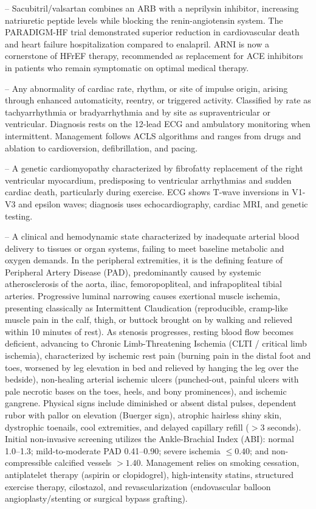-- Sacubitril/valsartan combines an ARB with a neprilysin inhibitor, increasing natriuretic peptide levels while blocking the renin-angiotensin system. The PARADIGM-HF trial demonstrated superior reduction in cardiovascular death and heart failure hospitalization compared to enalapril. ARNI is now a cornerstone of HFrEF therapy, recommended as replacement for ACE inhibitors in patients who remain symptomatic on optimal medical therapy.

-- Any abnormality of cardiac rate, rhythm, or site of impulse origin, arising through enhanced automaticity, reentry, or triggered activity. Classified by rate as tachyarrhythmia or bradyarrhythmia and by site as supraventricular or ventricular. Diagnosis rests on the 12-lead ECG and ambulatory monitoring when intermittent. Management follows ACLS algorithms and ranges from drugs and ablation to cardioversion, defibrillation, and pacing.

-- A genetic cardiomyopathy characterized by fibrofatty replacement of the right ventricular myocardium, predisposing to ventricular arrhythmias and sudden cardiac death, particularly during exercise. ECG shows T-wave inversions in V1-V3 and epsilon waves; diagnosis uses echocardiography, cardiac MRI, and genetic testing.

-- A clinical and hemodynamic state characterized by inadequate arterial blood delivery to tissues or organ systems, failing to meet baseline metabolic and oxygen demands. In the peripheral extremities, it is the defining feature of Peripheral Artery Disease (PAD), predominantly caused by systemic atherosclerosis of the aorta, iliac, femoropopliteal, and infrapopliteal tibial arteries. Progressive luminal narrowing causes exertional muscle ischemia, presenting classically as Intermittent Claudication (reproducible, cramp-like muscle pain in the calf, thigh, or buttock brought on by walking and relieved within 10 minutes of rest). As stenosis progresses, resting blood flow becomes deficient, advancing to Chronic Limb-Threatening Ischemia (CLTI / critical limb ischemia), characterized by ischemic rest pain (burning pain in the distal foot and toes, worsened by leg elevation in bed and relieved by hanging the leg over the bedside), non-healing arterial ischemic ulcers (punched-out, painful ulcers with pale necrotic bases on the toes, heels, and bony prominences), and ischemic gangrene. Physical signs include diminished or absent distal pulses, dependent rubor with pallor on elevation (Buerger sign), atrophic hairless shiny skin, dystrophic toenails, cool extremities, and delayed capillary refill ($>3$ seconds). Initial non-invasive screening utilizes the Ankle-Brachial Index (ABI): normal 1.0--1.3; mild-to-moderate PAD 0.41--0.90; severe ischemia $\le 0.40$; and non-compressible calcified vessels $>1.40$. Management relies on smoking cessation, antiplatelet therapy (aspirin or clopidogrel), high-intensity statins, structured exercise therapy, cilostazol, and revascularization (endovascular balloon angioplasty/stenting or surgical bypass grafting).

